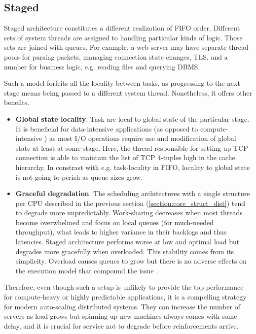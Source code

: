 \documentclass[12pt,a4paper,twoside]{report}
\begin{document}
\subsection{Staged}
\label{section:design-staged}

Staged architecture \cite{Welsh2001} constitutes a different realization of FIFO order. Different sets of system threads are assigned to handling particular kinds of logic. Those sets are joined with queues. For example, a web server may have separate thread pools for parsing packets, managing connection state changes, TLS, and a number for business logic, e.g. reading files and querying DBMS.  

Such a model forfeits all the locality between tasks, as progressing to the next stage means being passed to a different system thread. Nonetheless, it offers other benefits. 
\begin{itemize}
    \item \textbf{Global state locality}. Task are local to global state of the particular stage. It is beneficial for data-intensive applications (as opposed to compute-intensive \cite{Kleppmann2017-en}) as most I/O operations require use and modification of global state at least at some stage. Here, the thread responsible for setting up TCP connection is able to maintain the list of TCP 4-tuples high in the cache hierarchy. In constrast with e.g. task-locality in FIFO, locality to global state is not going to perish as queue sizes grow.
    \item \textbf{Graceful degradation}. The scheduling architectures with a single  structure per CPU described in the previous section (\ref{section:core_struct_dist}) tend to degrade more unpredictably. Work-sharing decreases when most threads become overwhelmed and focus on local queues (for much-needed throughput), what leads to higher variance in their backlogs and thus latencies. Staged architecture performs worse at low and optimal load but degrades more gracefully when overloaded. This stability comes from its simplicity. Overload causes queues to grow but there is no adverse effects on the execution model that compound the issue \cite{Welsh2001}.
\end{itemize}

Therefore, even though such a setup is unlikely to provide the top performance for compute-heavy or highly predictable applications, it is a compelling strategy for modern auto-scaling distributed systems. They can increase the number of servers as load grows but spinning up new machines always comes with some delay, and it is crucial for service not to degrade before reinforcements arrive.
\end{document}
